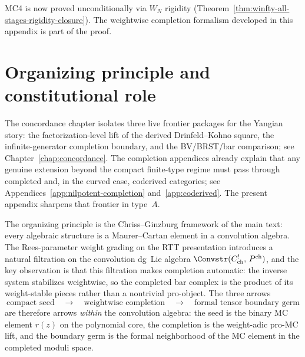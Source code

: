 \begin{remark}
MC4 is now proved unconditionally via $W_N$ rigidity
(Theorem~\ref{thm:winfty-all-stages-rigidity-closure}). The weightwise
completion formalism developed in this appendix is part of the proof.
\end{remark}

\section{Organizing principle and constitutional role}
\label{sec:typeA-organizing-principle}

The concordance chapter isolates three live frontier packages for the
Yangian story: the factorization-level lift of the derived
Drinfeld--Kohno square, the infinite-generator completion boundary, and
the BV/BRST/bar comparison; see Chapter~\ref{chap:concordance}. The
completion appendices already explain that any genuine extension beyond
the compact finite-type regime must pass through completed and, in the
curved case, coderived categories; see
Appendices~\ref{app:nilpotent-completion} and~\ref{app:coderived}.
The present appendix sharpens that frontier in type~$A$.

The organizing principle is the Chriss--Ginzburg framework of the main
text: every algebraic structure is a Maurer--Cartan element in a
convolution algebra. The Rees-parameter weight grading on the RTT
presentation introduces a natural filtration on the convolution dg~Lie
algebra $\Convstr(C^!_{\mathrm{ch}},\, P^{\mathrm{ch}})$, and the key
observation is that this filtration makes completion automatic: the
inverse system stabilizes weightwise, so the completed bar complex is
the product of its weight-stable pieces rather than a nontrivial
pro-object. The three arrows
\begin{equation}
\text{compact seed} \quad \longrightarrow \quad
\text{weightwise completion} \quad \longrightarrow \quad
\text{formal tensor boundary germ}
\end{equation}
are therefore arrows \emph{within} the convolution algebra: the seed is
the binary MC element $r(z)$ on the polynomial core, the completion is
the weight-adic pro-MC lift, and the boundary germ is the formal
neighborhood of the MC element in the completed moduli space.

